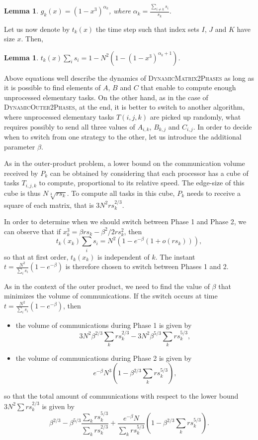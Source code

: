 \documentclass[a4paper,10pt]{article}
\newtheorem{lemma}[theorem]{Lemma}
\newcommand{\stupidthreshold}{\textsc{Dynamic\-Outer\-2Phases}\xspace}
\newcommand{\stupidthresholdmat}{\textsc{Dynamic\-Matrix\-2Phases}\xspace}
\begin{document}
\begin{lemma}
\label{lemgm}
$g_k(x)=(1-x^3)^{\alpha_k}$, where $\alpha_k = \frac{\sum_{i \neq k} s_i}{s_k}$.
\end{lemma}


Let us now denote by $t_k(x)$ the time step such that index sets $I$, $J$ and $K$ have size $x$.
Then,
\begin{lemma}
\label{lemTm}
$t_k(x) \sum_i s_i =1- N^2 (1- (1-x^3)^{\alpha_k+1})$.
\end{lemma}

Above equations well describe the dynamics of \stupidthresholdmat as long as it
is possible to find elements of $A$, $B$ and $C$ that enable to
compute enough unprocessed elementary tasks. On the other hand, as in
the case of \stupidthreshold, at the end, it is better to switch to another
algorithm, where unprocessed elementary tasks $T(i,j,k)$ are
picked up randomly, what requires possibly to send all three values of
$A_{i,k}$, $B_{k,j}$ and $C_{i,j}$. In order to decide when to switch
from one strategy to the other, let us introduce the additional
parameter $\beta$.


As in the outer-product problem, a lower bound on the communication
volume received by $P_k$ can be obtained by considering that each
processor has a cube of tasks $T_{i,j,k}$ to compute, proportional to
its relative speed. The edge-size of this cube is thus $N \sqrt[3]{\mathit{rs}_k}$.
To compute all tasks in this cube, $P_k$ needs to receive a square of
each matrix, that is $3 N^2 \mathit{rs}_k^{2/3}$. 

In order to determine when we should switch between Phase 1 and Phase 2, we
can observe that if $x_k^3= \beta \mathit{rs}_k - \beta^2/2
\mathit{rs}_k^2$, then 
$$
t_k(x_k) \sum_i s_i = N^2 ( 1 -e^{-\beta}(1+o(\mathit{rs}_k))),
$$
so that at first order, $t_k(x_k)$ is independent of $k$. The instant
$t=\frac{N^2}{\sum_i s_i} ( 1 - e^{-\beta})$ is therefore chosen to
switch between Phases 1 and 2.

As in the context of the outer product, we need to find the value of $\beta$ that minimizes the volume of communications. If the switch occurs at time $t=\frac{N^2}{\sum_i s_i} ( 1 - e^{-\beta})$, then
\begin{itemize}
\item the volume of communications during Phase 1 is given by $$3 N^2 \beta^{2/3} \sum_k \mathit{rs}_k^{2/3} - 3 N^2 \beta^{5/3} \sum_k \mathit{rs}_k^{5/3},$$
\item the volume of communications during Phase 2 is given by $$ e^{-\beta} N^3 \left(1 - \beta^{2/3} \sum_k \mathit{rs}_k^{5/3}\right),$$
\end{itemize}
so that the total amount of communications with respect to the lower bound $3 N^2 \sum \mathit{rs}_k^{2/3}$ is given by
$$ \beta^{2/3} - \beta^{5/3} \frac{\sum_k \mathit{rs}_k^{5/3}}{\sum_k \mathit{rs}_k^{2/3}} +  \frac{e^{-\beta} N}{\sum_k \mathit{rs}_k^{5/3}} \left(1 - \beta^{2/3} \sum_k \mathit{rs}_k^{5/3}\right).$$
\end{document}
